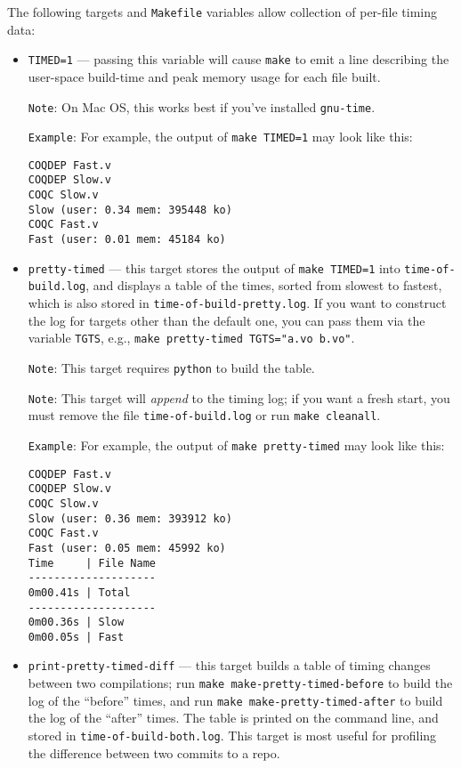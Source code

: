 The following targets and \texttt{Makefile} variables allow collection
of per-file timing data:
\begin{itemize}
\item \texttt{TIMED=1} --- passing this variable will cause
  \texttt{make} to emit a line describing the user-space build-time
  and peak memory usage for each file built.

  \texttt{Note}: On Mac OS, this works best if you've installed
  \texttt{gnu-time}.

  \texttt{Example}: For example, the output of \texttt{make TIMED=1}
  may look like this:
\begin{verbatim}
COQDEP Fast.v
COQDEP Slow.v
COQC Slow.v
Slow (user: 0.34 mem: 395448 ko)
COQC Fast.v
Fast (user: 0.01 mem: 45184 ko)
\end{verbatim}
\item \texttt{pretty-timed} --- this target stores the output of
  \texttt{make TIMED=1} into \texttt{time-of-build.log}, and displays
  a table of the times, sorted from slowest to fastest, which is also
  stored in \texttt{time-of-build-pretty.log}.  If you want to
  construct the log for targets other than the default one, you can
  pass them via the variable \texttt{TGTS}, e.g., \texttt{make
    pretty-timed TGTS="a.vo b.vo"}.

  \texttt{Note}: This target requires \texttt{python} to build the table.

  \texttt{Note}: This target will \emph{append} to the timing log; if
  you want a fresh start, you must remove the file
  \texttt{time-of-build.log} or run \texttt{make cleanall}.

  \texttt{Example}: For example, the output of \texttt{make
    pretty-timed} may look like this:
\begin{verbatim}
COQDEP Fast.v
COQDEP Slow.v
COQC Slow.v
Slow (user: 0.36 mem: 393912 ko)
COQC Fast.v
Fast (user: 0.05 mem: 45992 ko)
Time     | File Name
--------------------
0m00.41s | Total
--------------------
0m00.36s | Slow
0m00.05s | Fast
\end{verbatim}
\item \texttt{print-pretty-timed-diff} --- this target builds a table
  of timing changes between two compilations; run \texttt{make
    make-pretty-timed-before} to build the log of the ``before''
  times, and run \texttt{make make-pretty-timed-after} to build the
  log of the ``after'' times.  The table is printed on the command
  line, and stored in \texttt{time-of-build-both.log}.  This target is
  most useful for profiling the difference between two commits to a
  repo.


\end{itemize}
